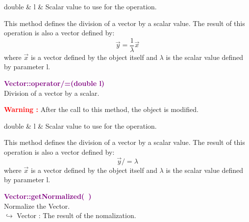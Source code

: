 \begin{tcolorbox}[width=\textwidth,myArgs,tabularx={ll|R}]
double & l & Scalar value to use for the operation.
\end{tcolorbox}

This method defines the division of a vector by a scalar value.
The result of this operation is also a vector defined by:
\begin{equation*}
\overrightarrow{y} = \frac{1}{\lambda} \overrightarrow{x}
\end{equation*}
where $\overrightarrow{x}$ is a vector defined by the object itself and $\lambda$ is the scalar value defined by parameter l.

\textcolor{purple}{\textbf{Vector::operator/=(double l)}}\label{Vector::operator/=(double l)}\\
Division of a vector by a scalar.

\hspace*{10mm}\textcolor{red}{\textbf{Warning :}} After the call to this method, the object is modified.

\begin{tcolorbox}[width=\textwidth,myArgs,tabularx={ll|R}]
double & l & Scalar value to use for the operation.
\end{tcolorbox}

This method defines the division of a vector by a scalar value.
The result of this operation is also a vector defined by:
\begin{equation*}
\overrightarrow{y} /= \lambda
\end{equation*}
where $\overrightarrow{x}$ is a vector defined by the object itself and $\lambda$ is the scalar value defined by parameter l.

\textcolor{purple}{\textbf{Vector::getNormalized(~)}}\label{Vector::getNormalized()}\\
Normalize the Vector.\\ \hspace*{10mm}$\hookrightarrow$  Vector : The result of the nomalization.

